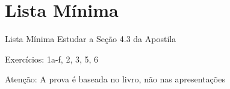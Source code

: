 \documentclass[fleqn,utf8,aspectratio=169,12pt]{beamer}
\begin{document}
%

\section{Lista Mínima}

\begin{frame}{Lista Mínima}
  Estudar a Seção 4.3 da Apostila

  Exercícios: 1a-f, 2, 3, 5, 6

  \vfill
  Atenção: A prova é baseada no livro, não nas apresentações
\end{frame}

\end{document}
